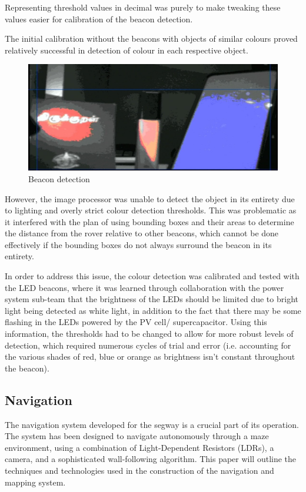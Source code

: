 Representing threshold values in decimal was purely to make tweaking these values easier for calibration of the beacon detection.

The initial calibration without the beacons with objects of similar colours proved relatively successful in detection of colour in each respective object.

\begin{figure}
    \centering
    \includegraphics{images/vision-demo.jpg}
    \caption{Beacon detection}
\end{figure}

However, the image processor was unable to detect the object in its entirety due to lighting and overly strict colour detection thresholds. This was problematic as it interfered with the plan of using bounding boxes and their areas to determine the distance from the rover relative to other beacons, which cannot be done effectively if the bounding boxes do not always surround the beacon in its entirety.

In order to address this issue, the colour detection was calibrated and tested with the LED beacons, where it was learned through collaboration with the power system sub-team that the brightness of the LEDs should be limited due to bright light being detected as white light, in addition to the fact that there may be some flashing in the LEDs powered by the PV cell/ supercapacitor. Using this information, the thresholds had to be changed to allow for more robust levels of detection, which required numerous cycles of trial and error (i.e. accounting for the various shades of red, blue or orange as brightness isn’t constant throughout the beacon).

\subsection{Navigation}

The navigation system developed for the segway is a crucial part of its operation. The system has been designed to navigate autonomously through a maze environment, using a combination of Light-Dependent Resistors (LDRs), a camera, and a sophisticated wall-following algorithm. This paper will outline the techniques and technologies used in the construction of the navigation and mapping system.

